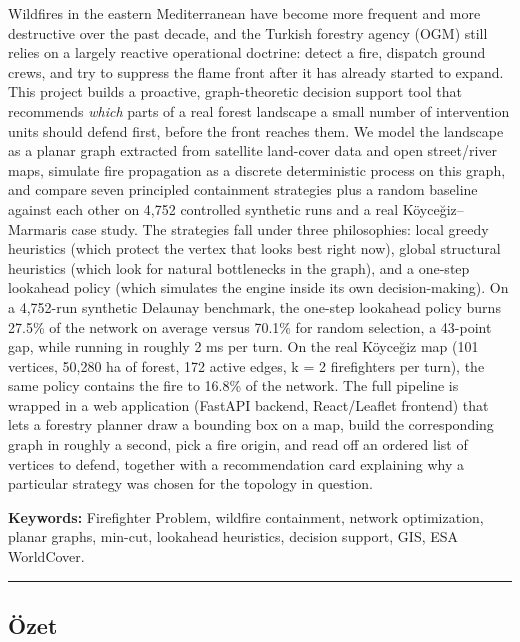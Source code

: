 \documentclass[
  11pt,
]{article}
\begin{document}
Wildfires in the eastern Mediterranean have become more frequent and
more destructive over the past decade, and the Turkish forestry agency
(OGM) still relies on a largely reactive operational doctrine: detect a
fire, dispatch ground crews, and try to suppress the flame front after
it has already started to expand. This project builds a proactive,
graph-theoretic decision support tool that recommends \emph{which} parts
of a real forest landscape a small number of intervention units should
defend first, before the front reaches them. We model the landscape as a
planar graph extracted from satellite land-cover data and open
street/river maps, simulate fire propagation as a discrete deterministic
process on this graph, and compare seven principled containment
strategies plus a random baseline against each other on 4,752 controlled
synthetic runs and a real Köyceğiz--Marmaris case study. The strategies
fall under three philosophies: local greedy heuristics (which protect
the vertex that looks best right now), global structural heuristics
(which look for natural bottlenecks in the graph), and a one-step
lookahead policy (which simulates the engine inside its own
decision-making). On a 4,752-run synthetic Delaunay benchmark, the
one-step lookahead policy burns 27.5\% of the network on average versus
70.1\% for random selection, a 43-point gap, while running in roughly 2
ms per turn. On the real Köyceğiz map (101 vertices, 50,280 ha of
forest, 172 active edges, k = 2 firefighters per turn), the same policy
contains the fire to 16.8\% of the network. The full pipeline is wrapped
in a web application (FastAPI backend, React/Leaflet frontend) that lets
a forestry planner draw a bounding box on a map, build the corresponding
graph in roughly a second, pick a fire origin, and read off an ordered
list of vertices to defend, together with a recommendation card
explaining why a particular strategy was chosen for the topology in
question.

\textbf{Keywords:} Firefighter Problem, wildfire containment, network
optimization, planar graphs, min-cut, lookahead heuristics, decision
support, GIS, ESA WorldCover.

\begin{center}\rule{0.5\linewidth}{0.5pt}\end{center}

\subsection{Özet}\label{uxf6zet}
\end{document}
